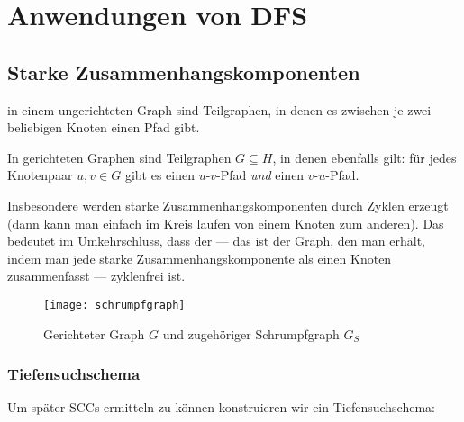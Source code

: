 \chapter{Anwendungen von DFS}

\section{Starke Zusammenhangskomponenten}

 in einem ungerichteten Graph sind Teilgraphen, in denen es zwischen je zwei beliebigen Knoten einen Pfad gibt.

In gerichteten Graphen sind  Teilgraphen \( G \subseteq H \), in denen ebenfalls gilt: für jedes Knotenpaar \( u,v \in G \) gibt es einen \( u \)-\( v \)-Pfad \emph{und} einen \( v \)-\( u \)-Pfad.

Insbesondere werden starke Zusammenhangskomponenten durch Zyklen erzeugt (dann kann man einfach im Kreis laufen von einem Knoten zum anderen). Das bedeutet im Umkehrschluss, dass der  --- das ist der Graph, den man erhält, indem man jede starke Zusammenhangskomponente als einen Knoten zusammenfasst --- zyklenfrei ist.

\begin{figure}[H]
  \texttt{[image: schrumpfgraph]}
  \caption{Gerichteter Graph \( G \) und zugehöriger Schrumpfgraph \( G_S \)}
\end{figure}

\subsection{Tiefensuchschema}

Um später SCCs ermitteln zu können konstruieren wir ein Tiefensuchschema:

